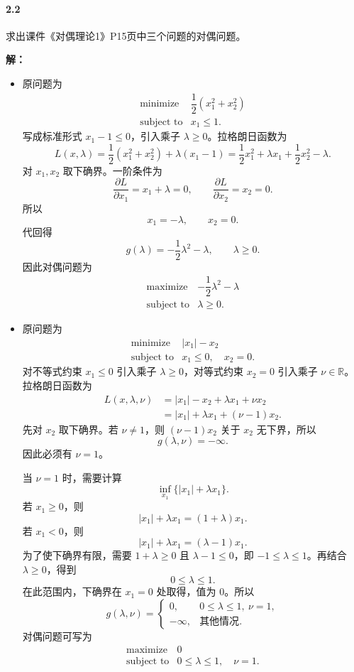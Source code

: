 \documentclass[12pt,a4paper]{article}
\begin{document}
\paragraph{2.2} 求出课件《对偶理论1》P15页中三个问题的对偶问题。

\textbf{解：}
\begin{itemize}
  \item[(1)] 原问题为
  \[
    \begin{array}{ll}
      \text{minimize} & \dfrac12(x_1^2+x_2^2)\\[0.3em]
      \text{subject to} & x_1\leq 1.
    \end{array}
  \]
  写成标准形式 $x_1-1\leq0$，引入乘子 $\lambda\geq0$。拉格朗日函数为
  \[
    L(x,\lambda)
    =\frac12(x_1^2+x_2^2)+\lambda(x_1-1)
    =\frac12x_1^2+\lambda x_1+\frac12x_2^2-\lambda.
  \]
  对 $x_1,x_2$ 取下确界。一阶条件为
  \[
    \frac{\partial L}{\partial x_1}=x_1+\lambda=0,\qquad
    \frac{\partial L}{\partial x_2}=x_2=0.
  \]
  所以
  \[
    x_1=-\lambda,\qquad x_2=0.
  \]
  代回得
  \[
    g(\lambda)=-\frac12\lambda^2-\lambda,\qquad \lambda\geq0.
  \]
  因此对偶问题为
  \[
    \boxed{
    \begin{array}{ll}
      \text{maximize} & -\dfrac12\lambda^2-\lambda\\[0.3em]
      \text{subject to} & \lambda\geq0.
    \end{array}}
  \]

  \item[(2)] 原问题为
  \[
    \begin{array}{ll}
      \text{minimize} & |x_1|-x_2\\
      \text{subject to} & x_1\leq0,\quad x_2=0.
    \end{array}
  \]
  对不等式约束 $x_1\leq0$ 引入乘子 $\lambda\geq0$，对等式约束 $x_2=0$ 引入乘子 $\nu\in\mathbb R$。拉格朗日函数为
  \[
  \begin{aligned}
    L(x,\lambda,\nu)
    &=|x_1|-x_2+\lambda x_1+\nu x_2\\
    &=|x_1|+\lambda x_1+(\nu-1)x_2.
  \end{aligned}
  \]
  先对 $x_2$ 取下确界。若 $\nu\neq1$，则 $(\nu-1)x_2$ 关于 $x_2$ 无下界，所以
  \[
    g(\lambda,\nu)=-\infty.
  \]
  因此必须有 $\nu=1$。

  当 $\nu=1$ 时，需要计算
  \[
    \inf_{x_1}\{|x_1|+\lambda x_1\}.
  \]
  若 $x_1\geq0$，则
  \[
    |x_1|+\lambda x_1=(1+\lambda)x_1.
  \]
  若 $x_1<0$，则
  \[
    |x_1|+\lambda x_1=(\lambda-1)x_1.
  \]
  为了使下确界有限，需要 $1+\lambda\geq0$ 且 $\lambda-1\leq0$，即 $-1\leq\lambda\leq1$。再结合 $\lambda\geq0$，得到
  \[
    0\leq\lambda\leq1.
  \]
  在此范围内，下确界在 $x_1=0$ 处取得，值为 $0$。所以
  \[
    g(\lambda,\nu)=
    \begin{cases}
      0, & 0\leq\lambda\leq1,\ \nu=1,\\
      -\infty, & \text{其他情况}.
    \end{cases}
  \]
  对偶问题可写为
  \[
    \boxed{
    \begin{array}{ll}
      \text{maximize} & 0\\
      \text{subject to} & 0\leq\lambda\leq1,\quad \nu=1.
    \end{array}}
  \]


\end{itemize}
\end{document}
